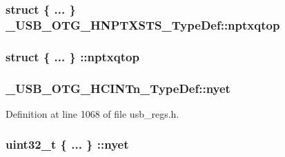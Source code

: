 \hypertarget{group___u_s_b___o_t_g___d_r_i_v_e_r_gac60267dff234320797a8a09809cc7b43}{
\subsubsection[{nptxqtop}]{\setlength{\rightskip}{0pt plus 5cm}struct \{ ... \}   \-\_\-\-U\-S\-B\-\_\-\-O\-T\-G\-\_\-\-H\-N\-P\-T\-X\-S\-T\-S\-\_\-\-Type\-Def\-::nptxqtop}}\label{group___u_s_b___o_t_g___d_r_i_v_e_r_gac60267dff234320797a8a09809cc7b43}
\hypertarget{group___u_s_b___o_t_g___d_r_i_v_e_r_ga913e0d763539a4465bf639f2bb2cd39b}{
\subsubsection[{nptxqtop}]{\setlength{\rightskip}{0pt plus 5cm}struct \{ ... \} \-::nptxqtop}}\label{group___u_s_b___o_t_g___d_r_i_v_e_r_ga913e0d763539a4465bf639f2bb2cd39b}
\hypertarget{group___u_s_b___o_t_g___d_r_i_v_e_r_gac351ade1b77042f81f65ddd7595c9de3}{
\subsubsection[{nyet}]{ \-\_\-\-U\-S\-B\-\_\-\-O\-T\-G\-\_\-\-H\-C\-I\-N\-Tn\-\_\-\-Type\-Def\-::nyet}}\label{group___u_s_b___o_t_g___d_r_i_v_e_r_gac351ade1b77042f81f65ddd7595c9de3}


Definition at line 1068 of file usb\-\_\-regs.\-h.

\hypertarget{group___u_s_b___o_t_g___d_r_i_v_e_r_ga4a3212d2f1a8d5bfe265b670564bd74b}{
\subsubsection[{nyet}]{\setlength{\rightskip}{0pt plus 5cm}uint32\-\_\-t \{ ... \} \-::nyet}}\label{group___u_s_b___o_t_g___d_r_i_v_e_r_ga4a3212d2f1a8d5bfe265b670564bd74b}


